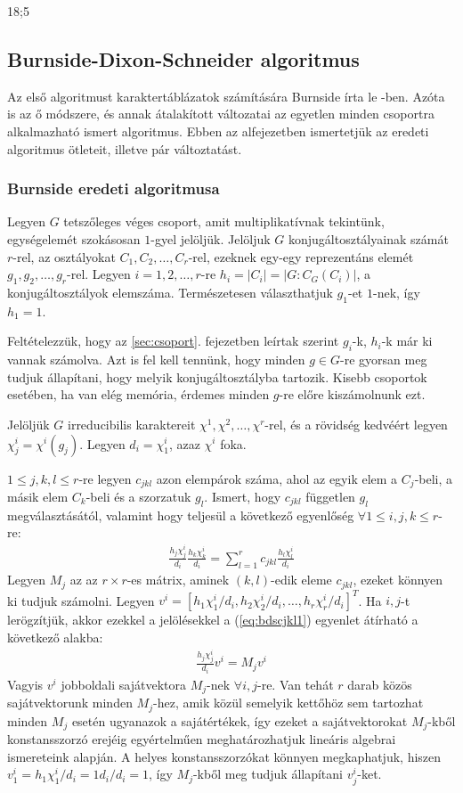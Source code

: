18;5~\subsection{Burnside-Dixon-Schneider algoritmus}
\label{subsec:bds}
Az első algoritmust karaktertáblázatok számítására Burnside írta le \cite{Bur11}-ben. Azóta is az ő módszere, és annak átalakított változatai
az egyetlen minden csoportra alkalmazható ismert algoritmus.
Ebben az alfejezetben ismertetjük az eredeti algoritmus ötleteit, illetve pár változtatást.

\subsubsection{Burnside eredeti algoritmusa}
\label{subsubsec:bdseredeti}
Legyen $G$ tetszőleges véges csoport, amit multiplikatívnak tekintünk, egységelemét szokásosan $1$-gyel jelöljük.
Jelöljuk $G$ konjugáltosztályainak számát $r$-rel, az osztályokat $C_1, C_2, \dots, C_r$-rel, ezeknek egy-egy reprezentáns elemét $g_1, g_2, \dots, g_r$-rel.
Legyen $i=1, 2, \dots, r$-re $h_i=|C_i|=|G:C_G(C_i)|$, a konjugáltosztályok elemszáma.
Természetesen választhatjuk $g_1$-et $1$-nek, így $h_1=1$.

Feltételezzük, hogy az \ref{sec:csoport}. fejezetben leírtak szerint $g_i$-k, $h_i$-k már ki vannak számolva.
Azt is fel kell tennünk, hogy minden $g\in G$-re gyorsan meg tudjuk állapítani, hogy melyik konjugáltosztályba tartozik.
Kisebb csoportok esetében, ha van elég memória, érdemes minden $g$-re előre kiszámolnunk ezt.

Jelöljük $G$ irreducibilis karaktereit $\chi^1, \chi^2, \dots, \chi^r$-rel, és a rövidség kedvéért legyen $\chi^i_j=\chi^i(g_j)$.
Legyen $d_i=\chi^i_1$, azaz $\chi^i$ foka.

$1 \le j, k, l \le r$-re legyen $c_{jkl}$ azon elempárok száma, ahol az egyik elem a $C_j$-beli, a másik elem $C_k$-beli és a szorzatuk $g_l$.
Ismert, hogy $c_{jkl}$ független $g_l$ megválasztásától, valamint hogy teljesül a következő egyenlőség $\forall 1 \le i, j, k \le r$-re:
\begin{align}
\label{eq:bdscjkl1}
\frac{h_j\chi^i_j}{d_i}\frac{h_k\chi^i_k}{d_i}=\sum_{l=1}^r c_{jkl}\frac{h_l\chi^i_l}{d_i}
\end{align}
Legyen $M_j$ az az $r\times r$-es mátrix, aminek $(k,l)$-edik eleme $c_{jkl}$, ezeket könnyen ki tudjuk számolni.
Legyen $v^i=[h_1\chi^i_1/d_i, h_2\chi^i_2/d_i, \dots, h_r\chi^i_r/d_i]^T$.
Ha $i, j$-t lerögzítjük, akkor ezekkel a jelölésekkel a (\ref{eq:bdscjkl1}) egyenlet átírható a következő alakba:
\begin{align}
\label{eq:bdscjkl2}
\frac{h_j\chi^i_j}{d_i}v^i=M_j v^i
\end{align}
Vagyis $v^i$ jobboldali sajátvektora $M_j$-nek $\forall i, j$-re.
Van tehát $r$ darab közös sajátvektorunk minden $M_j$-hez, amik közül semelyik kettőhöz sem tartozhat minden $M_j$ esetén ugyanazok a sajátértékek,
így ezeket a sajátvektorokat $M_j$-kből konstansszorzó erejéig egyértelműen meghatározhatjuk lineáris algebrai ismereteink alapján.
A helyes konstansszorzókat könnyen megkaphatjuk, hiszen $v^i_1=h_1\chi^i_1/d_i=1 d_i/d_i=1$, így $M_j$-kből meg tudjuk állapítani $v^i_j$-ket.

